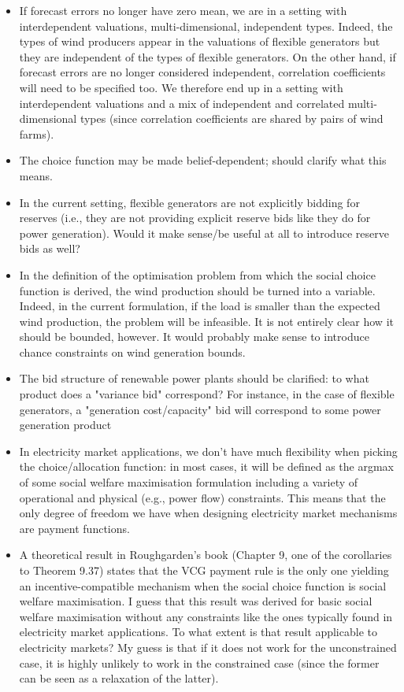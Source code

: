 \documentclass{article}
\begin{document}
\begin{itemize}
\item If forecast errors no longer have zero mean, we are in a setting with interdependent valuations, multi-dimensional, independent types. Indeed, the types of wind producers appear in the valuations of flexible generators but they are independent of the types of flexible generators. On the other hand, if forecast errors are no longer considered independent, correlation coefficients will need to be specified too. We therefore end up in a setting with interdependent valuations and a mix of independent and correlated multi-dimensional types (since correlation coefficients are shared by pairs of wind farms).
\item The choice function may be made belief-dependent; should clarify what this means.
\item In the current setting, flexible generators are not explicitly bidding for reserves (i.e., they are not providing explicit reserve bids like they do for power generation). Would it make sense/be useful at all to introduce reserve bids as well?
\item In the definition of the optimisation problem from which the social choice function is derived, the wind production should be turned into a variable. Indeed, in the current formulation, if the load is smaller than the expected wind production, the problem will be infeasible. It is not entirely clear how it should be bounded, however. It would probably make sense to introduce chance constraints on wind generation bounds. 
\item The bid structure of renewable power plants should be clarified: to what product does a "variance bid" correspond? For instance, in the case of flexible generators, a "generation cost/capacity" bid will correspond to some power generation product 
\item In electricity market applications, we don't have much flexibility when picking the choice/allocation function: in most cases, it will be defined as the argmax of some social welfare maximisation formulation including a variety of operational and physical (e.g., power flow) constraints. This means that the only degree of freedom we have when designing electricity market mechanisms are payment functions. 
\item A theoretical result in Roughgarden's book (Chapter 9, one of the corollaries to Theorem 9.37) states that the VCG payment rule is the only one yielding an incentive-compatible mechanism when the social choice function is social welfare maximisation. I guess that this result was derived for basic social welfare maximisation without any constraints like the ones typically found in electricity market applications. To what extent is that result applicable to electricity markets? My guess is that if it does not work for the unconstrained case, it is highly unlikely to work in the constrained case (since the former can be seen as a relaxation of the latter).

\end{itemize}
\end{document}

